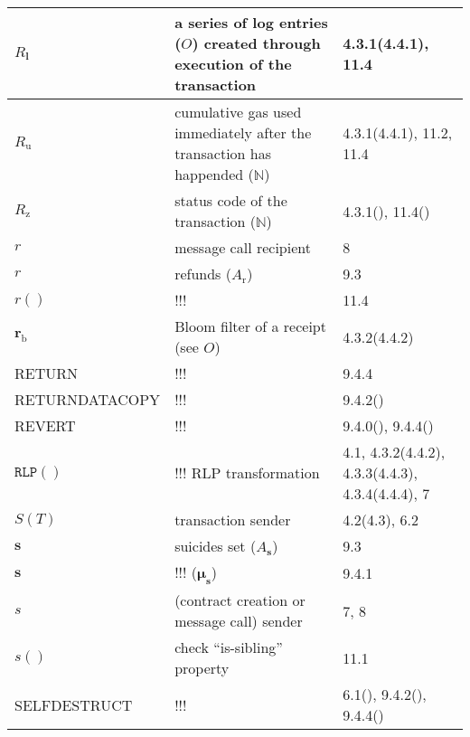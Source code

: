 \documentclass[9pt,oneside]{amsart}
\newcommand{\reff}[1]{{\footnotesize #1}}
\begin{document}
\begin{longtabu}{X[1.2lm] X[3] X}
$R_{\mathbf{l}}$ &
a series of log entries ($O$) created through execution of the transaction &
\reff{4.3.1(4.4.1), 11.4} \\\hline

$R_{\mathrm{u}}$ &
cumulative gas used immediately after the transaction has happended ($\mathbb{N}$) &
\reff{4.3.1(4.4.1), 11.2, 11.4} \\\hline

$R_{\mathrm{z}}$ &
status code of the transaction ($\mathbb{N}$) &
\reff{4.3.1(), 11.4()} \\\hline

$r$ &
message call recipient &
\reff{8} \\\hline

$r$ &
refunds ($A_{\mathrm{r}}$) &
\reff{9.3} \\\hline

$r()$ &
!!! &
\reff{11.4} \\\hline

$\mathbf{r}_{\mathrm{b}}$ &
Bloom filter of a receipt (see $O$) &
\reff{4.3.2(4.4.2)} \\\hline

{\small RETURN} &
!!! &
\reff{9.4.4} \\\hline

{\small RETURNDATACOPY} &
!!! &
\reff{9.4.2()} \\\hline

{\small REVERT} &
!!! &
\reff{9.4.0(), 9.4.4()} \\\hline

$\texttt{RLP}()$ &
!!! RLP transformation &
\reff{4.1, 4.3.2(4.4.2), 4.3.3(4.4.3), 4.3.4(4.4.4), 7} \\\hline

$S(T)$ &
transaction sender &
\reff{4.2(4.3), 6.2} \\\hline

$\mathbf{s}$ &
suicides set ($A_{\mathbf{s}}$) &
\reff{9.3} \\\hline

$\mathbf{s}$ &
!!! ($\boldsymbol{\mu}_{\mathbf{s}}$) &
\reff{9.4.1} \\\hline

$s$ &
(contract creation or message call) sender &
\reff{7, 8} \\\hline

$s()$ &
check ``is-sibling'' property &
\reff{11.1} \\\hline

{\small SELFDESTRUCT} &
!!! &
\reff{6.1(), 9.4.2(), 9.4.4()} \\\hline


\end{longtabu}
\end{document}
